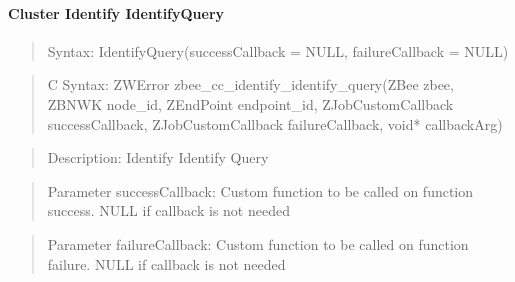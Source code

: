 \paragraph{Cluster Identify IdentifyQuery}
\begin{quote}Syntax: IdentifyQuery(successCallback = NULL, failureCallback = NULL)\end{quote}
\begin{quote}C Syntax: ZWError zbee\_cc\_identify\_identify\_query(ZBee zbee, ZBNWK node\_id, ZEndPoint endpoint\_id, ZJobCustomCallback successCallback, ZJobCustomCallback failureCallback, void* callbackArg)\end{quote}
\begin{quote}Description: Identify Identify Query\end{quote}
\begin{quote}Parameter successCallback: Custom function to be called on function success. NULL if callback is not needed\end{quote}
\begin{quote}Parameter failureCallback: Custom function to be called on function failure. NULL if callback is not needed\end{quote}


